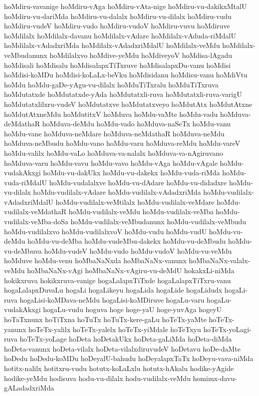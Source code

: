 {hoMdiru-vavanige
hoMdiru-vAga
hoMdiru-vAta-nige
hoMdiru-vu-dakikxMtalU
hoMdiru-vu-dariMda
hoMdiru-vu-dalalx
hoMdiru-vu-dilalx
hoMdiru-vudu
hoMdiru-vudeV
hoMdiru-vudo
hoMdiru-vudoV
hoMdiru-vuvu
hoMdiruve
hoMdilalx
hoMdilalx-davanu
hoMdilalx-vAdare
hoMdilalx-vAduda-riMdalU
hoMdilalx-vAdadxriMda
hoMdilalx-vAdadxriMdalU
hoMdilalx-veMdu
hoMdilalx-veMbudanunx
hoMdilalxvo
hoMdive-yeMdu
hoMdiveyoV
hoMdisa-lAgadu
hoMdisali
hoMdisalu
hoMdisalapxTiTxruve
hoMdisalapxDu-vanu
hoMdisi
hoMdisi-koMDu
hoMdisi-koLaLx-beVku
hoMdisidanu
hoMdisu-vanu
hoMdiVtu
hoMdu
hoMdu-gaDe-yAgu-vu-dilalx
hoMduTiTxralu
hoMduTiTxruva
hoMdutatxde
hoMdutatxde-yAda
hoMdutatxli-ruva
hoMdutatxli-ruva-varigU
hoMdutatxlilxru-vudeV
hoMdutatxve
hoMdutatxveyo
hoMdutAtx
hoMdutAtxne
hoMdutAtxneMdu
hoMdutitxV
hoMduva
hoMdu-vaMte
hoMdu-vadu
hoMduva-deMdathaR
hoMduva-deMdu
hoMdu-vado
hoMduva-naSeTx
hoMdu-vanu
hoMdu-vane
hoMduva-neMdare
hoMduva-neMdathaR
hoMduva-neMdu
hoMduva-neMbudu
hoMdu-vano
hoMdu-varu
hoMduva-reMdu
hoMdu-vareV
hoMdu-valilx
hoMdu-vaLo
hoMduva-va-nalalx
hoMduva-va-nAgiruvano
hoMduva-varu
hoMdu-vavu
hoMdu-vavo
hoMdu-vAga
hoMdu-vAgale
hoMdu-vudakAkxgi
hoMdu-vu-dakUkx
hoMdu-vu-dakekx
hoMdu-vuda-riMda
hoMdu-vuda-riMdalU
hoMdu-vudalalxve
hoMdu-vu-dAdare
hoMdu-vu-didadxre
hoMdu-vu-dilalx
hoMdu-vudilalx-vAdare
hoMdu-vudilalx-vAdadxriMda
hoMdu-vudilalx-vAdadxriMdalU
hoMdu-vudilalx-veMtilalx
hoMdu-vudilalx-veMdare
hoMdu-vudilalx-veMdathaR
hoMdu-vudilalx-veMdu
hoMdu-vudilalx-veMba
hoMdu-vudilalx-veMba-doSa
hoMdu-vudilalx-veMbudanunx
hoMdu-vudilalx-veMbudu
hoMdu-vudilalxvo
hoMdu-vudilalxvoV
hoMdu-vudu
hoMdu-vudU
hoMdu-vu-deMdu
hoMdu-vu-deMba
hoMdu-vudeMbu-dakekx
hoMdu-vu-deMbudu
hoMdu-vu-deMbuva
hoMdu-vudeV
hoMdu-vudo
hoMdu-vudoV
hoMdu-vu-veMdu
hoMduve
hoMdu-venu
hoMbaNaNxda
hoMbaNaNx-vanunx
hoMbaNaNx-valalx-veMdu
hoMbaNaNx-vAgi
hoMbaNaNx-vAgiru-vu-deMdU
hokakxLi-niMda
hokikxruva
hokikxruva-vanige
hogaLalapxTiTxde
hogaLalapxTiTxru-vanu
hogaLalapxDuvaLu
hogaLi
hogaLikeyu
hogaLida
hogaLide
hogaLidudx
hogaLi-ruva
hogaLisi-koMDava-neMdu
hogaLisi-koMDiruve
hogaLu-varu
hogaLu-vudakAkxgi
hogaLu-vudu
hoguva
hoge
hoge-yaU
hoge-yuvAga
hogeyU
hoTaTxnunx
hoTiTxna
hoTuTx
hoTuTx-kere-gaLu
hoTeTx-yaMte
hoTeTx-yanunx
hoTeTx-yalilx
hoTeTx-yalelx
hoTeTx-yiMdale
hoTeTxyu
hoTeTx-yoLagi-ruva
hoTeTx-yoLage
hoDeta
hoDetakUkx
hoDeta-gaLiMda
hoDeta-diMda
hoDeta-vanunx
hoDeta-vilalx
hoDeta-vilalxdiruvudeV
hoDetavu
hoDe-daMte
hoDedu
hoDedu-koMDu
hoDeyalU-bahudu
hoDeyalapxTaTx
hoDeyu-vava-niMda
hotitx-nalilx
hotitxru-vudu
hotutx-koLaLxlu
hotutx-hAkalu
hodike-yAgide
hodike-yeMdu
hodisuva
hodu-vu-dilalx
hodu-vudilalx-veMdu
homimx-davu-gALadadxriMda
}
